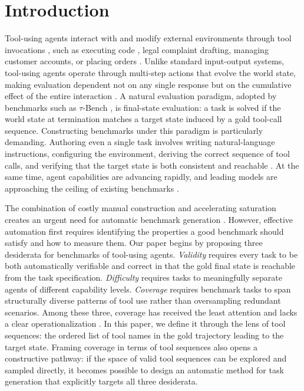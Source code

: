 \section{Introduction}

Tool-using agents interact with and modify external environments through tool invocations \citep{toolformer23shick}, such as executing code \citep{sweagent24yang, skyrl25cao}, legal complaint drafting, managing customer accounts, or placing orders \citep{lmars25wang, crmweaver25lai, fama25yan}. Unlike standard input-output systems, tool-using agents operate through multi-step actions that evolve the world state, making evaluation dependent not on any single response but on the cumulative effect of the entire interaction \citep{yehudai2025surveyevaluationllmbasedagents}. A natural evaluation paradigm, adopted by benchmarks such as $\tau$-Bench \citep{taubench_24_yao, tau2barres}, is final-state evaluation: a task is solved if the world state at termination matches a target state induced by a gold tool-call sequence.
Constructing benchmarks under this paradigm is particularly demanding. Authoring even a single task involves writing natural-language instructions, configuring the environment, deriving the correct sequence of tool calls, and verifying that the target state is both consistent and reachable \citep{saber2025cuadron, bestpractices2025Zhu}. At the same time, agent capabilities are advancing rapidly, and leading models are approaching the ceiling of existing benchmarks \citep{yehudai2025surveyevaluationllmbasedagents, taubench_24_yao, tau2barres, toolllm24qin, bfcl_25_patil, webarena_24_zhou, swebench_24_Jimenez}. 

The combination of costly manual construction and accelerating saturation creates an urgent need for automatic benchmark generation \citep{autocodebench25chou, deepscholarbench25patel}. However, effective automation first requires identifying the properties a good benchmark should satisfy and how to measure them. Our paper begins by proposing three desiderata for benchmarks of tool-using agents. \emph{Validity} requires every task to be both automatically verifiable and correct in that the gold final state is reachable from the task specification. \emph{Difficulty} requires tasks to meaningfully separate agents of different capability levels. \emph{Coverage} requires benchmark tasks to span structurally diverse patterns of tool use rather than oversampling redundant scenarios. Among these three, coverage has received the least attention and lacks a clear operationalization \citep{Mohammadi_survery_2025}. In this paper, we define it through the lens of tool sequences: the ordered list of tool names in the gold trajectory leading to the target state. Framing coverage in terms of tool sequences also opens a constructive pathway: if the space of valid tool sequences can be explored and sampled directly, it becomes possible to design an automatic method for task generation that explicitly targets all three desiderata. 

